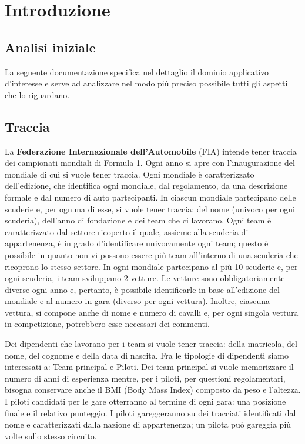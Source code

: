 \section{Introduzione}
\subsection{Analisi iniziale}
La seguente documentazione specifica nel dettaglio il dominio applicativo d'interesse e serve ad analizzare nel modo più preciso possibile tutti gli aspetti che lo riguardano.

\subsection{Traccia}
La \textbf{Federazione Internazionale dell'Automobile} (FIA) intende tener traccia dei campionati mondiali di Formula 1. Ogni anno si apre con l'inaugurazione del mondiale di cui si vuole tener traccia. Ogni mondiale è caratterizzato dell'edizione, che identifica ogni mondiale, dal regolamento, da una descrizione formale e dal numero di auto partecipanti. In ciascun mondiale partecipano delle scuderie e, per ognuna di esse, si vuole tener traccia: del nome (univoco per ogni scuderia), dell'anno di fondazione e dei team che ci lavorano. Ogni team è caratterizzato dal settore ricoperto il quale, assieme alla scuderia di appartenenza, è in grado d'identificare univocamente ogni team; questo è possibile in quanto non vi possono essere più team all'interno di una scuderia che ricoprono lo stesso settore. In ogni mondiale partecipano al più 10 scuderie e, per ogni scuderia, i team sviluppano 2 vetture. Le vetture sono obbligatoriamente diverse ogni anno e, pertanto, è possibile identificarle in base all'edizione del mondiale e al numero in gara (diverso per ogni vettura). Inoltre, ciascuna vettura, si compone anche di nome e numero di cavalli e, per ogni singola vettura in competizione, potrebbero esse necessari dei commenti. 

Dei dipendenti che lavorano per i team si vuole tener traccia: della matricola, del nome, del cognome e della data di nascita. Fra le tipologie di dipendenti siamo interessati a: Team principal e Piloti. Dei team principal si vuole memorizzare il numero di anni di esperienza mentre, per i piloti, per questioni regolamentari, bisogna conservare anche il BMI (Body Mass Index) composto da peso e l'altezza.
I piloti candidati per le gare otterranno al termine di ogni gara: una posizione finale e il relativo punteggio. I piloti gareggeranno su dei tracciati identificati dal nome e caratterizzati dalla nazione di appartenenza; un pilota può gareggia più volte sullo stesso circuito.